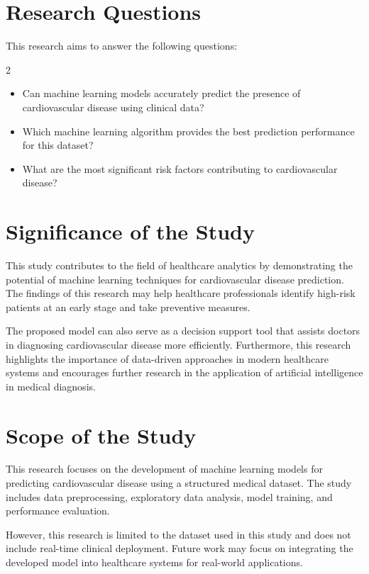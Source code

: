 \section{Research Questions}

This research aims to answer the following questions:

\begin{multicols}{2}
\begin{itemize}
\item Can machine learning models accurately predict the presence of cardiovascular disease using clinical data?
\item Which machine learning algorithm provides the best prediction performance for this dataset?
\item What are the most significant risk factors contributing to cardiovascular disease?
\end{itemize}
\end{multicols}

\section{Significance of the Study}

This study contributes to the field of healthcare analytics by demonstrating the potential of machine learning techniques for cardiovascular disease prediction. The findings of this research may help healthcare professionals identify high-risk patients at an early stage and take preventive measures.

The proposed model can also serve as a decision support tool that assists doctors in diagnosing cardiovascular disease more efficiently. Furthermore, this research highlights the importance of data-driven approaches in modern healthcare systems and encourages further research in the application of artificial intelligence in medical diagnosis.

\section{Scope of the Study}

This research focuses on the development of machine learning models for predicting cardiovascular disease using a structured medical dataset. The study includes data preprocessing, exploratory data analysis, model training, and performance evaluation.

However, this research is limited to the dataset used in this study and does not include real-time clinical deployment. Future work may focus on integrating the developed model into healthcare systems for real-world applications.

